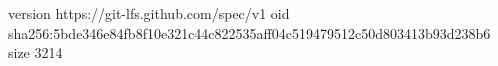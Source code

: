 version https://git-lfs.github.com/spec/v1
oid sha256:5bde346e84fb8f10e321c44c822535aff04c519479512c50d803413b93d238b6
size 3214
